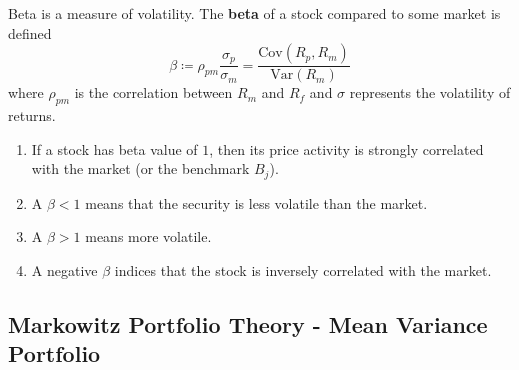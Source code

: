 \documentclass{article}
\begin{document}
  \begin{definition}[Beta]
    Beta is a measure of volatility. The \textbf{beta} of a stock compared to some market is defined 
    \begin{equation}
      \beta \coloneqq \rho_{pm} \frac{\sigma_p}{\sigma_m} = \frac{\mathrm{Cov}(R_p, R_m)}{\mathrm{Var}(R_m)}
    \end{equation}
    where $\rho_{pm}$ is the correlation between $R_m$ and $R_f$ and $\sigma$ represents the volatility of returns. 
    \begin{enumerate}
      \item If a stock has beta value of $1$, then its price activity is strongly correlated with the market (or the benchmark $B_j$). 
      \item A $\beta < 1$ means that the security is less volatile than the market. 
      \item A $\beta > 1$ means more volatile. 
      \item A negative $\beta$ indices that the stock is inversely correlated with the market. 
    \end{enumerate}
  \end{definition}

  \subsection{Markowitz Portfolio Theory - Mean Variance Portfolio}
    
\end{document}

